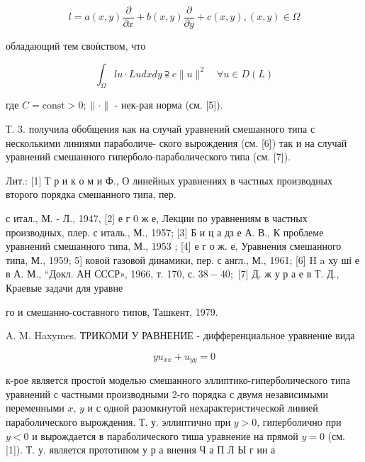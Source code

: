 \documentclass[10pt]{article}
\begin{document}
\[

l=a(x, y) \frac{\partial}{\partial x}+b(x, y) \frac{\partial}{\partial y}+c(x, y),(x, y) \in \Omega

\]



обладающий тем своӥством, что



\[

\int_{\Omega} l u \cdot L u d x d y \supseteqq c\|u\|^{2} \quad \forall u \in D(L)

\]



где $C=\mathrm{const}>0 ;\|\cdot\|$ - нек-рая норма (см. [5]).



Т. 3. получила обобщения как на случай уравнений смешанного типа с несколькими линиями параболиче- ского вырождения (см. [6]) так и на случай уравнений смешанного гиперболо-параболического типа (см. [7]).



Лит.: [1] Т р и к о м и Ф., О линейных уравнениях в частных производных второго порядка смешанного типа, пер.

с итал., М. - Л., 1947, [2] е г 0 ж е, Лекции по уравнениям в частных производных, плер. с италь., М., 1957; [3] Б и ц а дз е А. В., К проблеме уравнений смешанного типа, М., 1953 ; [4] е г о ж. е, Уравнения смешанного типа, М., 1959; 5] ковой газовой динамики, пер. с англ., М., 1961; [6] H a ху ші е в А. М., “Докл. АН СССР», 1966, т. 170, с. $38-40 ;$ [7] Д. ж у р а е в Т. Д., Краевые задачи для уравне

го и смешанно-составного типов, Ташкент, 1979.



A. M. Haxymes. ТРИКОМИ У РАВНЕНИЕ - дифференциальное уравнение вида



\[

y u_{x x}+u_{y y}=0

\]



к-рое является простоӥ моделью смешанного эллиптико-гиперболического типа уравнений с частными производными 2-го порядка с двумя независимыми переменными $x$, $y$ и с одной разомкнутой нехарактеристической линией параболического вырождения. Т. у. эллиптично при $y>0$, гиперболично при $y<0$ и вырождается в параболического тиша уравнение на прямой $y=0$ (см. [1]). Т. у. является прототипом у р а внения Ч а П Л Ы г ин а
\end{document}
